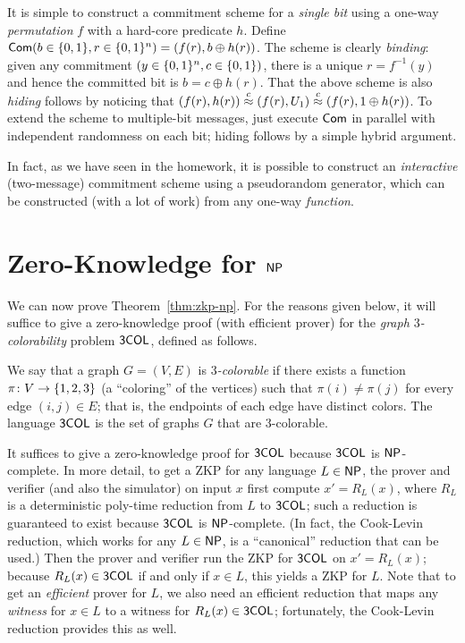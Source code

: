 \documentclass[11pt]{article}
\begin{document}
It is simple to construct a commitment scheme for a \emph{single bit}
using a one-way \emph{permutation} $f$ with a hard-core predicate $h$.
Define $\mathsf{Com}(b \in \{0,1\}, r \in \{0,1\}^n) = (f(r), b \oplus h(r))$.  The
scheme is clearly \textit{binding}: given any commitment $(y \in
\{0,1\}^{n}, c \in \{0,1\})$, there is a unique $r = f^{-1}(y)$ and hence
the committed bit is $b = c \oplus h(r)$.  That the above scheme is
also \emph{hiding} follows by noticing that $(f(r), h(r)) \stackrel{c}{\approx}
(f(r), U_1) \stackrel{c}{\approx} (f(r), 1 \oplus h(r))$.  To extend the scheme to
multiple-bit messages, just execute $\mathsf{Com}$ in parallel with
independent randomness on each bit; hiding follows by a simple hybrid
argument.

In fact, as we have seen in the homework, it is possible to construct
an \emph{interactive} (two-message) commitment scheme using a
pseudorandom generator, which can be constructed (with a lot of work)
from any one-way \emph{function}.

\section{Zero-Knowledge for $\mathsf{NP}$}
\label{sec:zero-knowledge-np}

\newcommand{\tcol}{\problem{3COL}}

We can now prove Theorem~\ref{thm:zkp-np}.  For the reasons given
below, it will suffice to give a zero-knowledge proof (with efficient
prover) for the \emph{graph $3$-colorability} problem $\tcol$, defined
as follows.

\begin{definition}
  \label{def:3col}
  We say that a graph $G = (V,E)$ is \emph{$3$-colorable} if there
  exists a function $\pi \colon V \to \{1,2,3\}$ (a ``coloring'' of
  the vertices) such that $\pi(i) \neq \pi(j)$ for every edge $(i,j)
  \in E$; that is, the endpoints of each edge have distinct colors.
  The language $\tcol$ is the set of graphs $G$ that are
  $3$-colorable.
\end{definition}

It suffices to give a zero-knowledge proof for $\tcol$ because $\tcol$
is $\mathsf{NP}$-complete.  In more detail, to get a ZKP for any language $L
\in \mathsf{NP}$, the prover and verifier (and also the simulator) on input
$x$ first compute $x' = R_{L}(x)$, where $R_{L}$ is a deterministic
poly-time reduction from $L$ to $\tcol$; such a reduction is
guaranteed to exist because $\tcol$ is $\mathsf{NP}$-complete.  (In fact, the
Cook-Levin reduction, which works for any $L \in \mathsf{NP}$, is a
``canonical'' reduction that can be used.)  Then the prover and
verifier run the ZKP for $\tcol$ on $x' = R_{L}(x)$; because $R_{L}(x)
\in \tcol$ if and only if $x \in L$, this yields a ZKP for $L$.  Note
that to get an \emph{efficient} prover for $L$, we also need an
efficient reduction that maps any \emph{witness} for $x \in L$ to a
witness for $R_{L}(x) \in \tcol$; fortunately, the Cook-Levin
reduction provides this as well.
\end{document}
